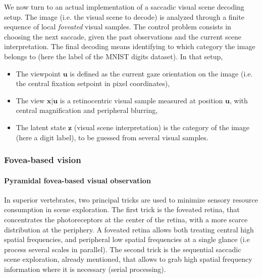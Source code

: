 \documentclass[12pt,twoside,openright]{article}
\begin{document}
We now turn to an actual implementation of a saccadic visual scene decoding setup. The   image (i.e. the visual scene to decode) is analyzed through a finite sequence of local \emph{foveated} visual samples.  The control problem consists in choosing the next saccade, given the past observations and the current scene interpretation. The final decoding means identifying to which category the image belongs to (here the label of the MNIST digits dataset). 
	In that setup, 
	\begin{itemize}
		\item The viewpoint $\boldsymbol{u}$ is defined as the current gaze orientation on the image (i.e. the central fixation setpoint in pixel coordinates),
		\item The view $\boldsymbol{x}|\boldsymbol{u}$ is a retinocentric visual sample measured at position $\boldsymbol{u}$, with central magnification and peripheral blurring,
		\item The latent state $\boldsymbol{z}$ (visual scene interpretation) is the category of the image (here a digit label), to be guessed from several visual samples.
	\end{itemize} 

\subsubsection{Fovea-based vision}\label{sec:fovea-based}

\paragraph{Pyramidal fovea-based visual observation} 
In superior vertebrates, two principal tricks are used to minimize sensory resource consumption in scene exploration. The first trick is the foveated retina, that concentrates the photoreceptors at the center of the retina, with a more scarce distribution at the periphery. A foveated retina allows both treating central high spatial frequencies, and peripheral low spatial frequencies at a single glance (i.e process several scales in parallel). The second trick is the sequential saccadic scene exploration, already mentioned, that allows to grab high spatial frequency information where it is necessary (serial processing).
\end{document}
